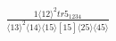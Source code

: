 \documentclass[varwidth, border=5pt]{standalone}
\begin{document}
\begin{my}
$\begin{gathered}
\scriptscriptstyle\frac{1⟨12⟩^2tr5_{1234}}{⟨13⟩^2⟨14⟩⟨15⟩[15]⟨25⟩⟨45⟩}
\end{gathered}$
\end{my}
\end{document}
